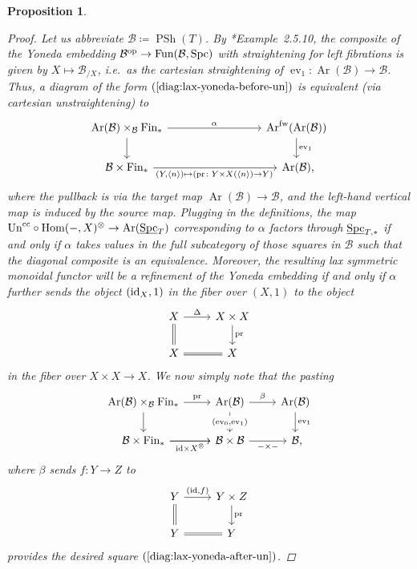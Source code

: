\documentclass[reqno]{memo-l}
\theoremstyle{mythm}
\newtheorem{prop}[thm]{Proposition}
\theoremstyle{definition}
\numberwithin{equation}{section}
\newcommand{\Bb}{{\mathcal{B}}}
\DeclareMathOperator{\ev}{ev}
\DeclareMathOperator{\Spc}{Spc}
\renewcommand{\hom}{\textup{hom}}
\newcommand{\Fun}{{\textup{Fun}}}
\DeclareMathOperator{\PSh}{PSh}
\DeclareMathOperator{\Ar}{Ar}
\newcommand{\op}{{\textup{op}}}
\renewcommand{\hom}{{\textup{Hom}}}
\newcommand{\id}{\textup{id}}
\newcommand{\pr}{\textup{pr}}
\newcommand{\Un}{\textup{Un}}
\newcommand{\ulhelper}[2]{\underline{\setbox0=\hbox{$#1#2$}\dp0=0.4pt \box0\relax}}
\newcommand{\ul}[1]{{\mathpalette\ulhelper{#1}}\hbox{\rule[-2pt]{0pt}{0pt}}}
\newcommand{\cc}{\text{cc}}
\begin{document}
\begin{prop}
\begin{proof}
        Let us abbreviate $\Bb\coloneqq\PSh(T)$. By \cite{HHLNb}*{Example~2.5.10}, the composite of the Yoneda embedding $\Bb^\op\to\Fun(\Bb,\Spc)$ with straightening for left fibrations is given by $X\mapsto\Bb_{/X}$, i.e.~as the \emph{cartesian} straightening of $\ev_1\colon\Ar(\Bb)\to\Bb$. Thus, a diagram of the form $(\ref{diag:lax-yoneda-before-un})$ is equivalent (via cartesian unstraightening) to
        \begin{equation}\label{diag:lax-yoneda-after-un}
            \begin{tikzcd}
                \Ar(\Bb)\times_\Bb\text{Fin}_*\arrow[d]\arrow[r,"\alpha"] &[6em] \Ar^\text{fw}(\Ar(\Bb))\arrow[d,"\ev_1"]\\
                \Bb\times\text{Fin}_*\arrow[r,"{(Y,\langle n\rangle)\mapsto (\pr\colon Y\times X(\langle n\rangle)\to Y)}\,"'] & \Ar(\Bb)\rlap,
            \end{tikzcd}
        \end{equation}
        where the pullback is via the target map $\Ar(\Bb)\to\Bb$, and the left-hand vertical map is induced by the source map.        
        Plugging in the definitions, the map $\Un^\cc\circ\hom(-,X)^\otimes\to\Ar(\ul\Spc_T)$ corresponding to $\alpha$ factors through $\ul\Spc_{T,*}$ if and only if $\alpha$ takes values in the full subcategory of those squares in $\Bb$ such that the diagonal composite is an equivalence. Moreover, the resulting lax symmetric monoidal functor will be a refinement of the Yoneda embedding if and only if $\alpha$ further sends the object $(\id_X,1)$ in the fiber over $(X,1)$ to the object
        \[
            \begin{tikzcd}
                X\arrow[d,equals]\arrow[r,"\Delta"] & X\times X\arrow[d,"\pr"]\\
                X\arrow[r,equals] & X
            \end{tikzcd}
        \]
        in the fiber over $X\times X\to X$. We now simply note that the pasting
        \[
            \begin{tikzcd}
                \arrow[d]\Ar(\Bb)\times_\Bb\text{Fin}_*\arrow[r,"\pr"] & \Ar(\Bb)\arrow[d,"{(\ev_0,\ev_1)}"{description}]\arrow[r,"\beta"] & \Ar(\Bb)\arrow[d,"\ev_1"]\\
                \Bb\times\text{Fin}_*\arrow[r,"\id\times X^\otimes"']\arrow[r] &\Bb\times\Bb\arrow[r,"{-}\times{-}"'] & \Bb\rlap,
            \end{tikzcd}
        \]
        where $\beta$ sends $f\colon Y\to Z$ to 
        \[
            \begin{tikzcd}
                Y\arrow[d,equals]\arrow[r,"{(\id,f)}"] & Y\times Z\arrow[d,"\pr"]\\
                Y\arrow[r,equals] & Y
            \end{tikzcd}
        \]
        provides the desired square $(\ref{diag:lax-yoneda-after-un})$.
    \end{proof}
\end{prop}
\end{document}
